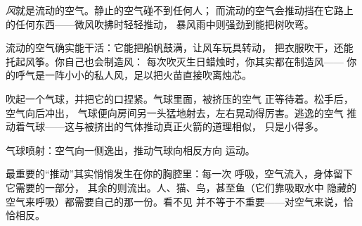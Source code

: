 \begin{definition}[风]\label{def:g2:air-around-us:wind}
\emph{风}就是流动的空气。静止的空气碰不到任何人；
而流动的空气会推动挡在它路上的任何东西——微风吹拂时轻轻推动，
暴风雨中则强劲到能把树吹弯。
\end{definition}

\begin{example}[空气的工作]\label{ex:g2:air-around-us:work}
流动的空气确实能干活：它能把船帆鼓满，让风车玩具转动，
把衣服吹干，还能托起风筝。你自己也会制造风：
每次吹灭生日蜡烛时，你其实都在制造风——
你的呼气是一阵小小的私人风，足以把火苗直接吹离烛芯。
\end{example}

\begin{example}\label{ex:g2:air-around-us:balloon}
吹起一个气球，并把它的口捏紧。气球里面，被挤压的空气
正等待着。松手后，空气向后冲出，
气球便向房间另一头猛地射去，左右晃动得厉害。逃逸的空气
推动着气球——这与被挤出的气体推动真正火箭的道理相似，
只是小得多。
\end{example}

\begin{omfigure}

{\small 气球喷射：空气向一侧逸出，推动气球向相反方向
运动。}
\end{omfigure}

\begin{remark}[空气很宝贵]\label{rem:g2:air-around-us:breathe}
最重要的“推动”其实悄悄发生在你的胸腔里：每一次
呼吸，空气流入，身体留下它需要的一部分，
其余的则流出。人、猫、鸟，甚至鱼（它们靠吸取水中
隐藏的空气来呼吸）都需要自己的那一份。看不见
并不等于不重要——对空气来说，恰恰相反。
\end{remark}

